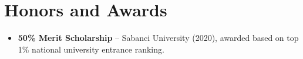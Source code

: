 \documentclass[11pt,a4paper,sans]{moderncv}
\begin{document}

\section{Honors and Awards}
\vspace{1pt}
\begin{itemize}
\item{\textbf{50\% Merit Scholarship} -- Sabanci University (2020), awarded based on top 1\% national university entrance ranking.}
\end{itemize}
\end{document}
